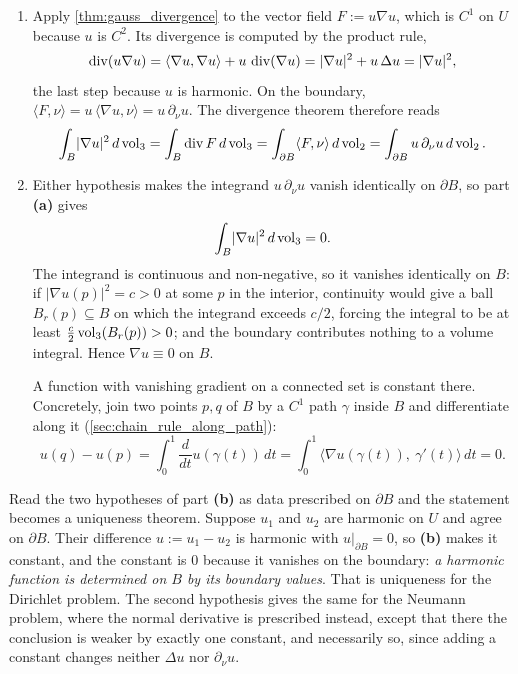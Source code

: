 \begin{exercisesolution}
\label{sol:green_first_identity_harmonic}
\begin{enumerate}[label=\textbf{(\alph*)}]
  \item Apply \cref{thm:gauss_divergence} to the vector field $F := u\nabla u$, which is $C^1$ on
    $U$ because $u$ is $C^2$. Its divergence is computed by the product rule,
    \[\operatorname{div}(u\nabla u) = \langle\nabla u,\nabla u\rangle + u\,\operatorname{div}(\nabla u)
      = \lvert\nabla u\rvert^2 + u\,\Delta u = \lvert\nabla u\rvert^2 ,\]
    the last step because $u$ is harmonic. On the boundary,
    $\langle F,\nu\rangle = u\,\langle\nabla u,\nu\rangle = u\,\partial_\nu u$. The divergence
    theorem therefore reads
    \[\int_B \lvert\nabla u\rvert^2 \,d\operatorname{vol}_3 = \int_B \operatorname{div} F\,d\operatorname{vol}_3
      = \int_{\partial B}\langle F,\nu\rangle\,d\operatorname{vol}_2
      = \int_{\partial B} u\,\partial_\nu u \,d\operatorname{vol}_2 .\]
  \item Either hypothesis makes the integrand $u\,\partial_\nu u$ vanish identically on
    $\partial B$, so part \textbf{(a)} gives
    \[\int_B \lvert\nabla u\rvert^2 \,d\operatorname{vol}_3 = 0 .\]
    The integrand is continuous and non-negative, so it vanishes identically on $B$: if
    $\lvert\nabla u(p)\rvert^2 = c > 0$ at some $p$ in the interior, continuity would give a ball
    $B_r(p) \subseteq B$ on which the integrand exceeds $c/2$, forcing the integral to be at
    least $\tfrac{c}{2}\operatorname{vol}_3(B_r(p)) > 0$; and the boundary contributes nothing to a volume
    integral. Hence $\nabla u \equiv 0$ on $B$.

    A function with vanishing gradient on a connected set is constant there. Concretely, join two
    points $p,q$ of $B$ by a $C^1$ path $\gamma$ inside $B$ and differentiate along it
    (\cref{sec:chain_rule_along_path}):
    \[u(q) - u(p) = \int_0^1 \frac{d}{dt}u(\gamma(t))\,dt
      = \int_0^1 \big\langle \nabla u(\gamma(t)),\ \gamma'(t)\big\rangle\,dt = 0 .\]
\end{enumerate}

\begin{remark}
Read the two hypotheses of part \textbf{(b)} as data prescribed on $\partial B$ and the statement
becomes a uniqueness theorem. Suppose $u_1$ and $u_2$ are harmonic on $U$ and agree on
$\partial B$. Their difference $u := u_1 - u_2$ is harmonic with $u|_{\partial B} = 0$, so
\textbf{(b)} makes it constant, and the constant is $0$ because it vanishes on the boundary:
\emph{a harmonic function is determined on $B$ by its boundary values}. That is uniqueness for
the Dirichlet problem. The second hypothesis gives the same for the Neumann problem, where the
normal derivative is prescribed instead, except that there the conclusion is weaker by exactly
one constant, and necessarily so, since adding a constant changes neither $\Delta u$ nor
$\partial_\nu u$.


\end{remark}
\end{exercisesolution}
